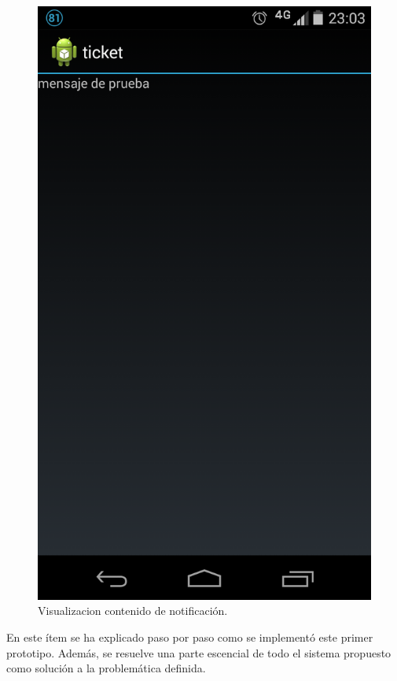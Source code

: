 \begin{figure}[H]
\centering
\includegraphics[scale=0.20]{images/capitulo5/notificacionApp.png}
\caption{Visualizacion contenido de notificación.}
\label{notificacionContenido}
\end{figure}

En este ítem se ha explicado paso por paso como se implementó este primer prototipo. Además, se resuelve una parte escencial de todo el sistema propuesto como solución a la problemática definida.\\

